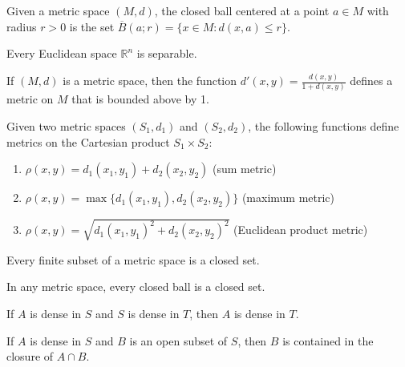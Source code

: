 \begin{definition}
Given a metric space $(M,d)$, the closed ball centered at a point $a \in M$ with radius $r > 0$ is the set $\overline{B}(a;r) = \{x \in M : d(x,a) \leq r\}$.
\end{definition}

\begin{theorem}
Every Euclidean space $\mathbb{R}^n$ is separable.
\end{theorem}

\begin{theorem}
If $(M,d)$ is a metric space, then the function $d'(x,y) = \frac{d(x,y)}{1 + d(x,y)}$ defines a metric on $M$ that is bounded above by 1.
\end{theorem}

\begin{theorem}
Given two metric spaces $(S_1,d_1)$ and $(S_2,d_2)$, the following functions define metrics on the Cartesian product $S_1 \times S_2$:
\begin{enumerate}
\item $\rho(x,y) = d_1(x_1,y_1) + d_2(x_2,y_2)$ (sum metric)
\item $\rho(x,y) = \max\{d_1(x_1,y_1), d_2(x_2,y_2)\}$ (maximum metric)
\item $\rho(x,y) = \sqrt{d_1(x_1,y_1)^2 + d_2(x_2,y_2)^2}$ (Euclidean product metric)
\end{enumerate}
\end{theorem}

\begin{theorem}
Every finite subset of a metric space is a closed set.
\end{theorem}

\begin{theorem}
In any metric space, every closed ball is a closed set.
\end{theorem}

\begin{theorem}
If $A$ is dense in $S$ and $S$ is dense in $T$, then $A$ is dense in $T$.
\end{theorem}

\begin{theorem}
If $A$ is dense in $S$ and $B$ is an open subset of $S$, then $B$ is contained in the closure of $A \cap B$.
\end{theorem}

